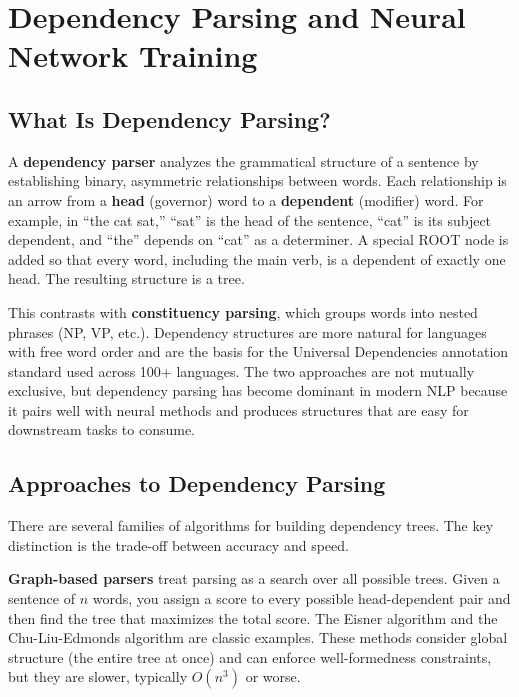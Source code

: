 \documentclass[11pt]{article}
\begin{document}
\newpage
\section{Dependency Parsing and Neural Network Training}

\subsection{What Is Dependency Parsing?}

A \textbf{dependency parser} analyzes the grammatical structure of a sentence by establishing binary, asymmetric relationships between words. Each relationship is an arrow from a \textbf{head} (governor) word to a \textbf{dependent} (modifier) word. For example, in ``the cat sat,'' ``sat'' is the head of the sentence, ``cat'' is its subject dependent, and ``the'' depends on ``cat'' as a determiner. A special ROOT node is added so that every word, including the main verb, is a dependent of exactly one head. The resulting structure is a tree.

This contrasts with \textbf{constituency parsing}, which groups words into nested phrases (NP, VP, etc.). Dependency structures are more natural for languages with free word order and are the basis for the Universal Dependencies annotation standard used across 100+ languages. The two approaches are not mutually exclusive, but dependency parsing has become dominant in modern NLP because it pairs well with neural methods and produces structures that are easy for downstream tasks to consume.

\subsection{Approaches to Dependency Parsing}

There are several families of algorithms for building dependency trees. The key distinction is the trade-off between accuracy and speed.

\textbf{Graph-based parsers} treat parsing as a search over all possible trees. Given a sentence of $n$ words, you assign a score to every possible head-dependent pair and then find the tree that maximizes the total score. The Eisner algorithm and the Chu-Liu-Edmonds algorithm are classic examples. These methods consider global structure (the entire tree at once) and can enforce well-formedness constraints, but they are slower, typically $O(n^3)$ or worse.
\end{document}
